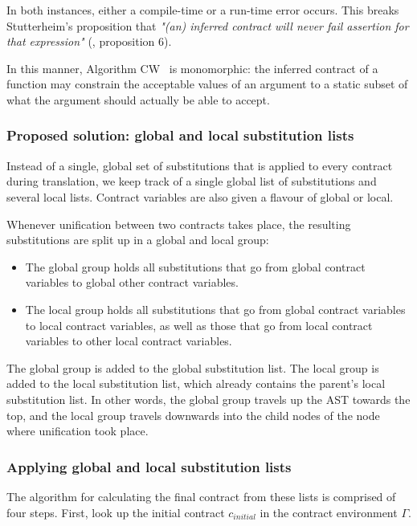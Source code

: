 \documentclass[10pt]{report}
\begin{document}
{In both instances, either a compile-time or a run-time error occurs.
This breaks Stutterheim's proposition that \textit{"(an) inferred contract will never fail assertion for that expression"} (\cite{Stutterheim:2013:thesis}, proposition 6). 

In this manner, Algorithm CW ~is monomorphic: the inferred contract of a function may constrain the acceptable values of an argument to a static subset of what the argument should actually be able to accept.

\subsubsection{Proposed solution: global and local substitution lists}

Instead of a single, global set of substitutions that is applied to every contract during translation, we keep track of a single global list of substitutions and several local lists.
Contract variables are also given a flavour of global or local.

Whenever unification between two contracts takes place, the resulting substitutions are split up in a global and local group:
\begin{itemize}
\item The global group holds all substitutions that go from global contract variables to global other contract variables.
\item The local group holds all substitutions that go from global contract variables to local contract variables, as well as those that go from local contract variables to other local contract variables.
\end{itemize}

The global group is added to the global substitution list.
The local group is added to the local substitution list, which already contains the parent's local substitution list.
In other words, the global group travels up the AST towards the top, and the local group travels downwards into the child nodes of the node where unification took place.

\subsubsection{Applying global and local substitution lists}

The algorithm for calculating the final contract from these lists is comprised of four steps.
First, look up the initial contract $c_{initial}$ in the contract environment $\Gamma$.

}
\end{document}
